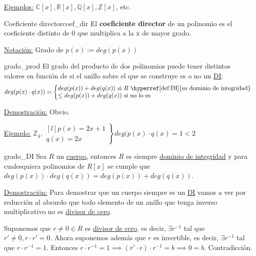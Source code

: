 \documentclass[10pt, a4paper]{article}
\newcommand{\R}{\mathbb{R}}
\newcommand{\Z}{\mathbb{Z}}
\newcommand{\C}{\mathbb{C}}
\newcommand{\Q}{\mathbb{Q}}
\newcommand{\ej}{\underline{Ejemplo:} }
\newcommand{\ejs}{\underline{Ejemplos:} }
\newcommand{\nota}{\underline{Notación:} }
\newcommand{\demo}{\underline{Demostración:} }
\begin{document}
\ejs $\C[x], \R[x], \Q[x], \Z[x]$, etc.

\begin{definition}{Coeficiente director}{coef_dir}
El \textbf{coeficiente director} de un polinomio es el coeficiente distinto de 0 que multiplica a la x de mayor grado.
\end{definition}

\nota Grado de $p(x) := deg(p(x))$

\vspace{3mm}

\begin{proposition}{}{grado_prod}
El grado del producto de dos polinomios puede tener distintos valores en función de si el anillo sobre el que se construye es o no un \hyperref[def:DI]{DI}:
\[
deg(p(x) \cdot q(x)) = \left \{
\begin{matrix*}[l]
deg(p(x)) + deg(q(x)) \text{ si $R$ \hyperref[def:DI]{es dominio de integridad}} \\
\leq deg(p(x)) + deg(q(x)) \text{ si no lo es}
\end{matrix*} \right .
\]
\end{proposition}

\demo Obvio.

\vspace{3mm}

\ej $\Z_4, \left .
\begin{matrix*}[l]
p(x) = 2x + 1 \\
q(x) = 2x
\end{matrix*} \right \}
deg(p(x) \cdot q(x) = 1 < 2$

\vspace{3mm}

\begin{proposition}{}{grado_DI}
 Sea $R$ un \hyperref[def:cuerpo]{cuerpo}, entonces $R$ es siempre \hyperref[def:DI]{dominio de integridad} y para cualesquiera polinomios de $R[x]$ se cumple que $deg(p(x)) \cdot deg(q(x)) = deg(p(x)) + deg(q(x))$.	
\end{proposition} 
 
\demo Para demostrar que un cuerpo siempre es un \hyperref[def:DI]{DI} vamos a ver por reducción al absurdo que todo elemento de un anillo que tenga inverso multiplicativo no es \hyperref[def:div_cero]{divisor de cero}.

Suponemos que $r \neq 0 \in R$ es \hyperref[def:div_cero]{divisor de cero}, es decir, $\exists r^{-1}$ tal que $r' \neq 0, r \cdot r' = 0$. Ahora suponemos además que $r$ es invertible, es decir, $\exists r^{-1}$ tal que $r \cdot r^{-1} = 1$. Entonces $r \cdot r^{-1} = 1 \implies (r' \cdot r) \cdot r^{-1} = b \implies 0 = b$. Contradicción.
\end{document}
